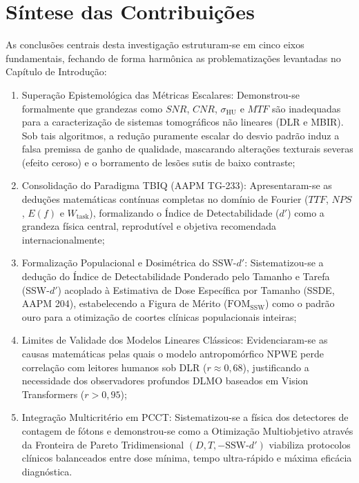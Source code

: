 \documentclass[
  12pt,
  a4paper,
  oneside
]{report}
\begin{document}
\section{Síntese das Contribuições}
\label{sec:sintese_contribuicoes_finais}
As conclusões centrais desta investigação estruturam-se em cinco eixos fundamentais, fechando de forma harmônica as problematizações levantadas no Capítulo de Introdução:
\begin{enumerate}
  \item Superação Epistemológica das Métricas Escalares: Demonstrou-se formalmente que grandezas como $SNR$, $CNR$, $\sigma_{\text{HU}}$ e $MTF$ são inadequadas para a caracterização de sistemas tomográficos não lineares (DLR e MBIR). Sob tais algoritmos, a redução puramente escalar do desvio padrão induz a falsa premissa de ganho de qualidade, mascarando alterações texturais severas (efeito ceroso) e o borramento de lesões sutis de baixo contraste;
  \item Consolidação do Paradigma TBIQ (AAPM TG-233): Apresentaram-se as deduções matemáticas contínuas completas no domínio de Fourier ($TTF$, $NPS$, $E(f)$ e $W_{\text{task}}$), formalizando o Índice de Detectabilidade ($d'$) como a grandeza física central, reprodutível e objetiva recomendada internacionalmente;
  \item Formalização Populacional e Dosimétrica do SSW-$d'$: Sistematizou-se a dedução do Índice de Detectabilidade Ponderado pelo Tamanho e Tarefa (SSW-$d'$) acoplado à Estimativa de Dose Específica por Tamanho (SSDE, AAPM 204), estabelecendo a Figura de Mérito ($\text{FOM}_{\text{SSW}}$) como o padrão ouro para a otimização de coortes clínicas populacionais inteiras;
  \item Limites de Validade dos Modelos Lineares Clássicos: Evidenciaram-se as causas matemáticas pelas quais o modelo antropomórfico NPWE perde correlação com leitores humanos sob DLR ($r \approx 0{,}68$), justificando a necessidade dos observadores profundos DLMO baseados em Vision Transformers ($r > 0{,}95$);
  \item Integração Multicritério em PCCT: Sistematizou-se a física dos detectores de contagem de fótons e demonstrou-se como a Otimização Multiobjetivo através da Fronteira de Pareto Tridimensional $(D, T, -\text{SSW-}d')$ viabiliza protocolos clínicos balanceados entre dose mínima, tempo ultra-rápido e máxima eficácia diagnóstica.
\end{enumerate}
\end{document}
